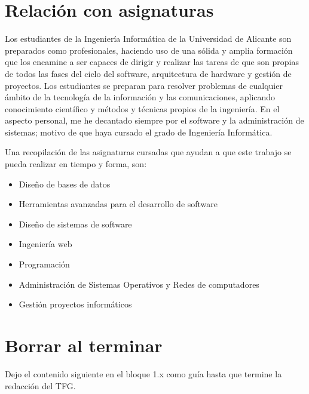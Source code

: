 \section{Relación con asignaturas}
Los estudiantes de la Ingeniería Informática de la Universidad de Alicante son preparados como profesionales, haciendo uso de una sólida y amplia formación que los encamine a ser capaces de dirigir y realizar las tareas de que son propias de todos las fases del ciclo del software, arquitectura de hardware y gestión de proyectos. Los estudiantes se preparan para resolver problemas de cualquier ámbito de la tecnología de la información y las comunicaciones, aplicando conocimiento científico y métodos y técnicas propios de la ingeniería.
En el aspecto personal, me he decantado siempre por el software y la administración de sistemas; motivo de que haya cursado el grado de Ingeniería Informática.
\vspace{1em}
\par Una recopilación de las asignaturas cursadas que ayudan a que este trabajo se pueda realizar en tiempo y forma, son:
\begin{itemize}
    \item Diseño de bases de datos
    \item Herramientas avanzadas para el desarrollo de software
    \item Diseño de sistemas de software
    \item Ingeniería web
    \item Programación
    \item Administración de Sistemas Operativos y Redes de computadores
    \item Gestión proyectos informáticos
\end{itemize}

\section{Borrar al terminar}
Dejo el contenido siguiente en el bloque 1.x como guía hasta que termine la redacción del TFG.


